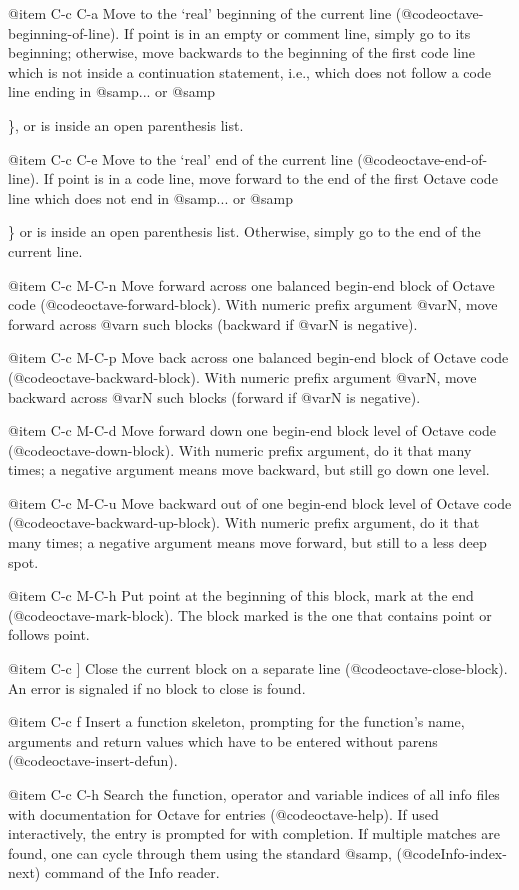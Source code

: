 @item C-c C-a
Move to the `real' beginning of the current line
(@code{octave-beginning-of-line}).  If point is in an empty or comment
line, simply go to its beginning;  otherwise, move backwards to the
beginning of the first code line which is not inside a continuation
statement,  i.e., which does not follow a code line ending in @samp{...}
or @samp{\}, or is inside an open parenthesis list.

@item C-c C-e
Move to the `real' end of the current line (@code{octave-end-of-line}).
If point is in a code line, move forward to the end of the first Octave
code line which does not end in @samp{...} or @samp{\} or is inside an
open parenthesis list.  Otherwise, simply go to the end of the current
line.

@item C-c M-C-n
Move forward across one balanced begin-end block of Octave code
(@code{octave-forward-block}).  With numeric prefix argument @var{N},
move forward across @var{n} such blocks (backward if @var{N} is
negative).

@item C-c M-C-p
Move back across one balanced begin-end block of Octave code
(@code{octave-backward-block}).  With numeric prefix argument @var{N},
move backward across @var{N} such blocks (forward if @var{N} is
negative).

@item C-c M-C-d
Move forward down one begin-end block level of Octave code
(@code{octave-down-block}).  With numeric prefix argument, do it that
many times;  a negative argument means move backward, but still go down
one level.

@item C-c M-C-u
Move backward out of one begin-end block level of Octave code
(@code{octave-backward-up-block}).  With numeric prefix argument, do it
that many times; a negative argument means move forward, but still to a
less deep spot.

@item C-c M-C-h
Put point at the beginning of this block, mark at the end
(@code{octave-mark-block}).
The block marked is the one that contains point or follows point.

@item C-c ]
Close the current block on a separate line (@code{octave-close-block}).
An error is signaled if no block to close is found.

@item C-c f
Insert a function skeleton, prompting for the function's name, arguments
and return values which have to be entered without parens
(@code{octave-insert-defun}).

@item C-c C-h
Search the function, operator and variable indices of all info files
with documentation for Octave for entries (@code{octave-help}).  If used
interactively, the entry is prompted for with completion.  If multiple
matches are found, one can cycle through them using the standard
@samp{,} (@code{Info-index-next}) command of the Info reader.

}}
